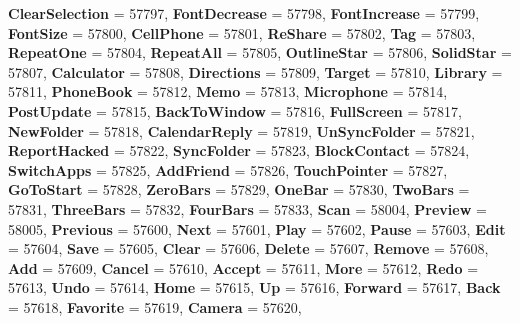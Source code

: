 \begin{DoxyCompactItemize}
{\bfseries Clear\+Selection} = 57797, 
{\bfseries Font\+Decrease} = 57798, 
{\bfseries Font\+Increase} = 57799, 
\newline
{\bfseries Font\+Size} = 57800, 
{\bfseries Cell\+Phone} = 57801, 
{\bfseries Re\+Share} = 57802, 
{\bfseries Tag} = 57803, 
\newline
{\bfseries Repeat\+One} = 57804, 
{\bfseries Repeat\+All} = 57805, 
{\bfseries Outline\+Star} = 57806, 
{\bfseries Solid\+Star} = 57807, 
\newline
{\bfseries Calculator} = 57808, 
{\bfseries Directions} = 57809, 
{\bfseries Target} = 57810, 
{\bfseries Library} = 57811, 
\newline
{\bfseries Phone\+Book} = 57812, 
{\bfseries Memo} = 57813, 
{\bfseries Microphone} = 57814, 
{\bfseries Post\+Update} = 57815, 
\newline
{\bfseries Back\+To\+Window} = 57816, 
{\bfseries Full\+Screen} = 57817, 
{\bfseries New\+Folder} = 57818, 
{\bfseries Calendar\+Reply} = 57819, 
\newline
{\bfseries Un\+Sync\+Folder} = 57821, 
{\bfseries Report\+Hacked} = 57822, 
{\bfseries Sync\+Folder} = 57823, 
{\bfseries Block\+Contact} = 57824, 
\newline
{\bfseries Switch\+Apps} = 57825, 
{\bfseries Add\+Friend} = 57826, 
{\bfseries Touch\+Pointer} = 57827, 
{\bfseries Go\+To\+Start} = 57828, 
\newline
{\bfseries Zero\+Bars} = 57829, 
{\bfseries One\+Bar} = 57830, 
{\bfseries Two\+Bars} = 57831, 
{\bfseries Three\+Bars} = 57832, 
\newline
{\bfseries Four\+Bars} = 57833, 
{\bfseries Scan} = 58004, 
{\bfseries Preview} = 58005, 
{\bfseries Previous} = 57600, 
\newline
{\bfseries Next} = 57601, 
{\bfseries Play} = 57602, 
{\bfseries Pause} = 57603, 
{\bfseries Edit} = 57604, 
\newline
{\bfseries Save} = 57605, 
{\bfseries Clear} = 57606, 
{\bfseries Delete} = 57607, 
{\bfseries Remove} = 57608, 
\newline
{\bfseries Add} = 57609, 
{\bfseries Cancel} = 57610, 
{\bfseries Accept} = 57611, 
{\bfseries More} = 57612, 
\newline
{\bfseries Redo} = 57613, 
{\bfseries Undo} = 57614, 
{\bfseries Home} = 57615, 
{\bfseries Up} = 57616, 
\newline
{\bfseries Forward} = 57617, 
{\bfseries Back} = 57618, 
{\bfseries Favorite} = 57619, 
{\bfseries Camera} = 57620, 
\newline

\end{DoxyCompactItemize}
